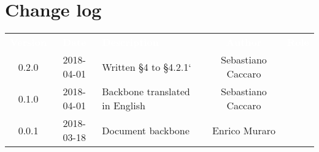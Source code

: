 \section*{Change log}
{
	\renewcommand{\arraystretch}{1.5}
	\centering
	\begin{longtable}{ c c C{6cm} c c }
		\textcolor{white}{\textbf{Version}} & \textcolor{white}{\textbf{Date}} & \textcolor{white}{\textbf{Description}} & \textcolor{white}{\textbf{Author}} & \textcolor{white}{\textbf{Role}}\\
		
		0.2.0 & 2018-04-01 & Written §4 to §4.2.1`  & Sebastiano Caccaro & \reda{}\\
		0.1.0 & 2018-04-01 & Backbone translated in English & Sebastiano Caccaro & \reda{}\\
		0.0.1 & 2018-03-18 & Document backbone & Enrico Muraro & \reda{}\\
		
	\end{longtable}

}